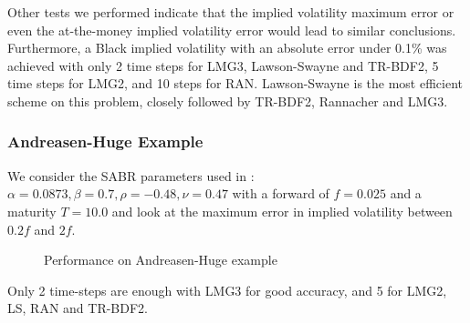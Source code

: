 \documentclass[]{rAMF2e}
\begin{document}
Other tests we performed indicate that the implied volatility maximum error or even the at-the-money implied volatility error would lead to similar conclusions. Furthermore, a Black implied volatility with an absolute error under 0.1\% was achieved with only 2 time steps for LMG3, Lawson-Swayne and TR-BDF2, 5 time steps for LMG2, and 10 steps for RAN. Lawson-Swayne is the most efficient scheme on this problem, closely followed by TR-BDF2, Rannacher and LMG3.

\subsubsection{Andreasen-Huge Example}
We consider the SABR parameters used in \citep{andreasen2011zabr}: $\alpha=0.0873, \beta=0.7, \rho=-0.48, \nu=0.47$ with a forward of $f=0.025$ and a maturity $T=10.0$ and look at the maximum error in implied volatility between $0.2f$ and $2f$.

\begin{figure}[htb]
  \begin{center}  
    \end{center}
     \caption{\label{fig:perf_ah_500} Performance on Andreasen-Huge example}
\end{figure}



Only 2 time-steps are enough with  LMG3 for good accuracy, and 5 for LMG2, LS, RAN and TR-BDF2. 
\end{document}

